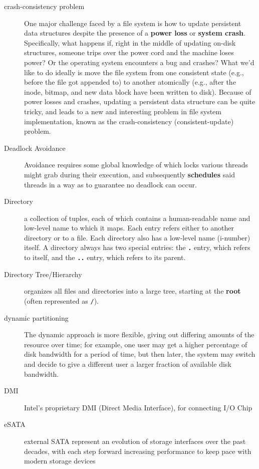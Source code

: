 \begin{description}
\item[crash-consistency problem] One major challenge faced by a file system is how to update persistent data structures despite the presence of a \textbf{power loss} or \textbf{system crash}. Specifically, what happens if, right in the middle of updating on-disk structures, someone trips over the power cord and the machine loses power? Or the operating system encounters a bug and crashes? What we’d like to do ideally is move the file system from one consistent state (e.g., before the file got appended to) to another atomically (e.g., after the inode, bitmap, and new data block have been written to disk). Because of power losses and crashes, updating a persistent data structure can be quite tricky, and leads to a new and interesting problem in file system implementation, known as the crash-consistency (consistent-update) problem.

\item[Deadlock Avoidance] Avoidance requires some global knowledge of which locks various threads might grab during their execution, and subsequently \textbf{schedules} said threads in a way as to guarantee no deadlock can occur.

\item[Directory] a collection of tuples, each of which contains a human-readable name and low-level name to which it maps. Each entry refers either to another directory or to a file. Each directory also has a low-level name (i-number) itself. A directory always has two special entries: the \textbf{\texttt{.}} entry, which refers to itself, and the \textbf{\texttt{..}} entry, which refers to its parent.

\item[Directory Tree/Hierarchy] organizes all files and directories into a large tree, starting at the \textbf{root} (often represented as \texttt{/}).

\item[dynamic partitioning] The dynamic approach is more flexible, giving out differing amounts of the resource over time; for example, one user may get a higher percentage of disk bandwidth for a period of time, but then later, the system may switch and decide to give a different user a larger fraction of available disk bandwidth.

\item[DMI]  Intel’s proprietary DMI (Direct Media Interface), for connecting I/O Chip

\item[eSATA] external SATA represent an evolution of storage interfaces over the past decades, with each step forward increasing performance to keep pace with modern storage devices


\end{description}
